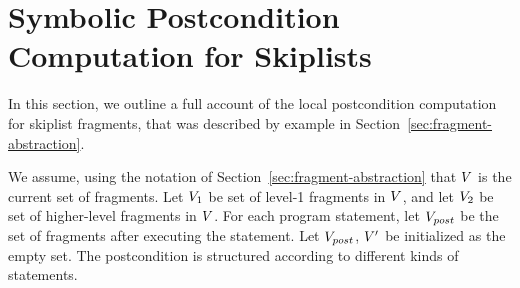 \section{Symbolic Postcondition Computation for Skiplists}
\label{app:skiplists}

In this section, we outline a full account of the local postcondition computation
for skiplist fragments, that was described by example in
Section~\ref{sec:fragment-abstraction}.

We assume, using the notation of Section~\ref{sec:fragment-abstraction} that
$V$ is the current set of fragments. 
Let $V_1$ be set of level-1 fragments in $V$,
and let $V_2$ be set of higher-level fragments in $V$. For each program statement, let $V_{post}$ be the set of fragments after executing the statement. Let $V_{post}$, $V'$ be initialized as the empty set.
The postcondition is structured according to different kinds of statements.

